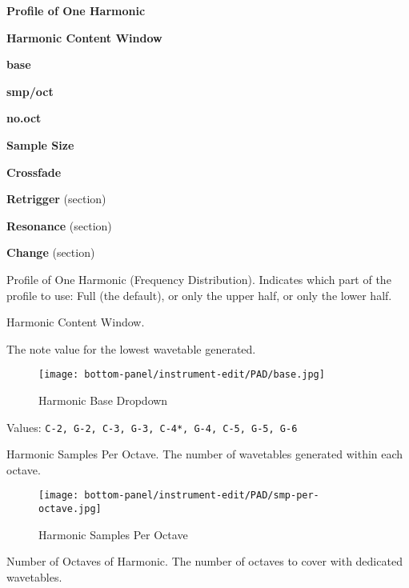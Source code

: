    \begin{enumber}
      \item \textbf{Profile of One Harmonic}
      \item \textbf{Harmonic Content Window}
      \item \textbf{base}
      \item \textbf{smp/oct}
      \item \textbf{no.oct}
      \item \textbf{Sample Size}
      \item \textbf{Crossfade}
      \item \textbf{Retrigger} (section)
      \item \textbf{Resonance} (section)
      \item \textbf{Change} (section)
   \end{enumber}

   \setcounter{ItemCounter}{0}      %

   Profile of One Harmonic (Frequency Distribution).
   Indicates which part of the profile to use: Full (the default), or only the
   upper half, or only the lower half.

   Harmonic Content Window.

   The note value for the lowest wavetable generated.

\begin{figure}[H]
   \centering
   \texttt{[image: bottom-panel/instrument-edit/PAD/base.jpg]}
   \caption{Harmonic Base Dropdown}
   \label{fig:padsynth_harmonic_base_dropdown}
\end{figure}

   Values: \texttt{C-2, G-2, C-3, G-3, C-4*, G-4, C-5, G-5, G-6}

   Harmonic Samples Per Octave.
   The number of wavetables generated within each octave.

\begin{figure}[H]
   \centering
   \texttt{[image: bottom-panel/instrument-edit/PAD/smp-per-octave.jpg]}
   \caption{Harmonic Samples Per Octave}
   \label{fig:padsynth_harmonic_samples_per_octave}
\end{figure}

   Number of Octaves of Harmonic.
   The number of octaves to cover with dedicated wavetables.

